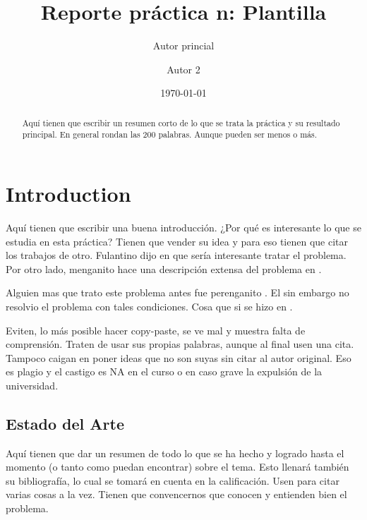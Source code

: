 \documentclass[pre,amsmath,amssymb, twocolumn, showpacs]{revtex4}
\begin{document}
\title{Reporte práctica n: Plantilla }
\author{Autor princial } %
\author{Autor 2}
 
\date{\today}
\begin{abstract}
 Aquí tienen que escribir un resumen corto de lo que se trata la práctica y su 
 resultado principal. En general rondan las 200 palabras. Aunque pueden ser menos o más. 
\end{abstract}


\maketitle

\section{Introduction}

Aquí tienen que escribir una buena introducción. ¿Por qué es interesante lo que se estudia en esta práctica? Tienen que vender su idea y para eso tienen que citar los trabajos de otro. Fulantino dijo en \cite{art1} que sería interesante tratar el problema. Por otro lado, menganito hace una descripción extensa del problema en \cite{libro1}. 

Alguien mas que trato este problema antes fue perenganito \cite{Internet1}. El sin embargo no resolvio el problema con tales condiciones. Cosa que si se hizo en \cite{Congreso1}. 

Eviten, lo más posible hacer copy-paste, se ve mal y muestra falta de comprensión. Traten de usar sus propias palabras, aunque al final usen una cita. Tampoco caigan en poner ideas que no son suyas sin citar al autor original. Eso es plagio y el castigo es NA en el curso o en caso grave la expulsión de la universidad.  

\subsection{Estado del Arte}

Aquí tienen que dar un resumen de todo lo que se ha hecho y logrado hasta el momento (o tanto como puedan encontrar) sobre el tema. Esto llenará también su bibliografía, lo cual se tomará en cuenta en la calificación. Usen \cite{Internet1, art1, libro1, unpublished1} para citar varias cosas a la vez. Tienen que convencernos que conocen y entienden bien el problema. 
\end{document}
